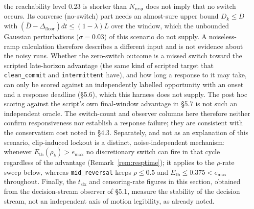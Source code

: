 \documentclass[11pt]{article}
\newcommand{\Dfloor}{\Delta_{\text{floor}}}
\newcommand{\Eth}{E_{\text{th}}}
\newcommand{\code}[1]{\texttt{#1}}
\begin{document}
the reachability level $0.23$ is shorter than $N_{\text{resp}}$ does not imply that no switch occurs. Its converse (no-switch) part needs an almost-sure upper bound $D_k\le\bar D$ with $(\bar D-\Dfloor)dt\le(1-\lambda)L$ over the window, which the unbounded Gaussian perturbations ($\sigma=0.03$) of this scenario do not supply. A noiseless-ramp calculation therefore describes a different input and is not evidence about the noisy runs. Whether the zero-switch outcome is a missed switch toward the scripted late-horizon advantage (the same kind of scripted target that \code{clean\_commit} and \code{intermittent} have), and how long a response to it may take, can only be scored against an independently labelled opportunity with an onset and a response deadline (\S5.6), which this harness does not supply. The post hoc scoring against the script's own final-window advantage in \S5.7 is not such an independent oracle. The switch-count and observer columns here therefore neither confirm responsiveness nor establish a response failure; they are consistent with the conservatism cost noted in \S4.3. Separately, and not as an explanation of this scenario, clip-induced lockout is a distinct, noise-independent mechanism: whenever $\Eth(\rho_k)>e_{\max}$ no discretionary switch can fire in that cycle regardless of the advantage (Remark~\ref{rem:resptime}); it applies to the $\rho$-rate sweep below, whereas \code{mid\_reversal} keeps $\rho\le0.5$ and $\Eth\le0.375<e_{\max}$ throughout. Finally, the $t_{\text{sfx}}$ and censoring-rate figures in this section, obtained from the decision-stream observer of \S5.1, measure the stability of the decision stream, not an independent axis of motion legibility, as already noted.
\end{document}
